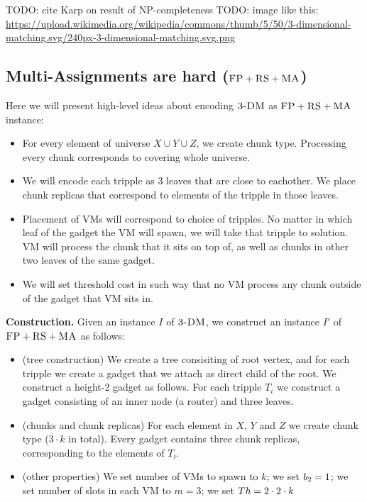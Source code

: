TODO: cite Karp on result of NP-completeness
TODO: image like this: \url{https://upload.wikimedia.org/wikipedia/commons/thumb/5/50/3-dimensional-matching.svg/240px-3-dimensional-matching.svg.png}

\subsection{Multi-Assignments are hard ($\textsc{FP}+\textsc{RS}+\textsc{MA}$)}\label{ssec:fprsma}

Here we will present high-level ideas about encoding $\textsc{3-DM}$ as
 $\textsc{FP}+\textsc{RS}+\textsc{MA}$ instance:

 \begin{itemize} \item For every element of universe $X\cup Y\cup
 Z$, we create chunk type. Processing every chunk corresponds to
 covering whole universe.

 \item We will encode each tripple as $3$ leaves that are close to
 eachother. We place chunk replicas that correspond to elements of the
 tripple in those leaves.

 \item Placement of VMs will correspond to choice of tripples. No
 matter in which leaf of the gadget the VM will spawn, we will take
 that tripple to solution. VM will process the chunk that it sits on
 top of, as well as chunks in other two leaves of the same gadget.
 
\item We will set threshold cost in such way that no VM process
any chunk outside of the gadget that VM sits in.
\end{itemize}

\textbf{Construction.}
Given an instance $I$ of $\textsc{3-DM}$, we construct an instance $I'$ of
$\textsc{FP}+\textsc{RS}+\textsc{MA}$ as follows:
\begin{itemize}
\item (tree construction) We create a tree consisiting of root vertex,
and for each tripple we create a gadget that we attach as direct child
of the root. We construct a height-2 gadget
as follows. For each tripple $T_i$ we construct a gadget
consisting of an inner node (a router) and three leaves.
\item (chunks and chunk replicas) For each element in $X$, $Y$ and $Z$ we create chunk type
($3 \cdot k$ in total). Every gadget
contains three chunk replicas, corresponding to the elements of $T_i$.
\item (other properties) We set number of VMs to spawn to $k$; we set
$b_2=1$; we set number of slots in each VM to $m=3$; we set
$Th=2 \cdot 2 \cdot k$
\end{itemize}

